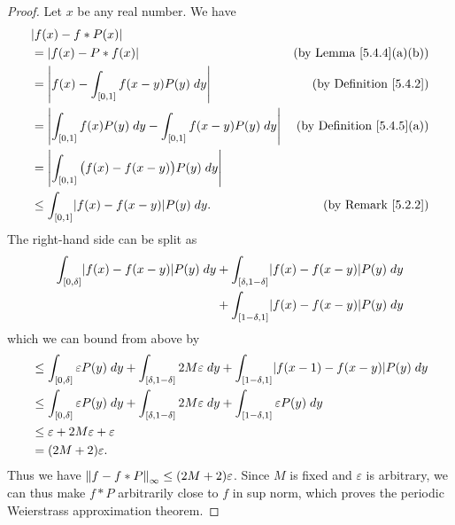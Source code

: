 \begin{proof}
    Let \(x\) be any real number.
    We have
    \begin{align*}
         & \abs*{f(x) - f * P(x)}                                                                                             \\
         & = \abs*{f(x) - P * f(x)}                                                   & \text{(by Lemma \ref{5.4.4}(a)(b))}   \\
         & = \abs*{f(x) - \int_{[0, 1]} f(x - y) P(y) \; dy}                          & \text{(by Definition \ref{5.4.2})}    \\
         & = \abs*{\int_{[0, 1]} f(x) P(y) \; dy - \int_{[0, 1]} f(x - y) P(y) \; dy} & \text{(by Definition \ref{5.4.5}(a))} \\
         & = \abs*{\int_{[0, 1]} \big(f(x) - f(x - y)\big) P(y) \; dy}                                                        \\
         & \leq \int_{[0, 1]} \abs*{f(x) - f(x - y)} P(y) \; dy.                      & \text{(by Remark \ref{5.2.2})}
    \end{align*}
    The right-hand side can be split as
    \begin{align*}
        \int_{[0, \delta]} \abs*{f(x) - f(x - y)} P(y) \; dy & + \int_{[\delta, 1 - \delta]} \abs*{f(x) - f(x - y)} P(y) \; dy \\
                                                             & + \int_{[1 - \delta, 1]} \abs*{f(x) - f(x - y)} P(y) \; dy
    \end{align*}
    which we can bound from above by
    \begin{align*}
         & \leq \int_{[0, \delta]} \varepsilon P(y) \; dy + \int_{[\delta, 1 - \delta]} 2 M \varepsilon \; dy + \int_{[1 - \delta, 1]} \abs*{f(x - 1) - f(x - y)} P(y) \; dy \\
         & \leq \int_{[0, \delta]} \varepsilon P(y) \; dy + \int_{[\delta, 1 - \delta]} 2 M \varepsilon \; dy + \int_{[1 - \delta, 1]} \varepsilon P(y) \; dy                \\
         & \leq \varepsilon + 2 M \varepsilon + \varepsilon                                                                                                                  \\
         & = (2M + 2) \varepsilon.
    \end{align*}
    Thus we have \(\norm*{f - f * P}_{\infty} \leq (2M + 2) \varepsilon\).
    Since \(M\) is fixed and \(\varepsilon\) is arbitrary, we can thus make \(f * P\) arbitrarily close to \(f\) in sup norm, which proves the periodic Weierstrass approximation theorem.
\end{proof}

